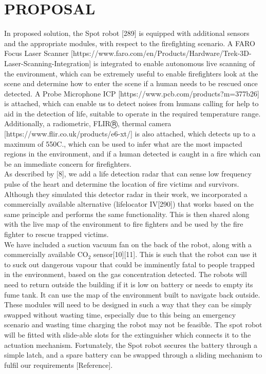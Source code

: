 \section{PROPOSAL}\label{Sec:method}
In proposed solution, the Spot robot [289] is equipped with additional sensors and the appropriate modules, with respect to the firefighting scenario. A FARO Focus Laser Scanner [https://www.faro.com/en/Products/Hardware/Trek-3D-Laser-Scanning-Integration] is integrated to enable autonomous live scanning of the environment, which can be extremely useful to enable firefighters look at the scene and determine how to enter the scene if a human needs to be rescued once detected. A Probe Microphone ICP [https://www.pcb.com/products?m=377b26] is attached, which can enable us to detect noises from humans calling for help to aid in the detection of life, suitable to operate in the required temperature range. Additionally, a radiometric, FLIRⓇ, thermal camera [https://www.flir.co.uk/products/e6-xt/] is also attached, which detects up to a maximum of 550\degree C., which can be used to infer what are the most impacted regions in the environment, and if a human detected is caught in a fire which can be an immediate concern for firefighters. \\

As described by [8], we add a life detection radar that can sense low frequency pulse of the heart and determine the location of fire victims and survivors. Although they simulated this detector radar in their work, we incorporated a commercially available alternative (lifelocator IV[290]) that works based on the same principle and performs the same functionality. This is then shared along with the live map of the environment to fire fighters and be used by the fire fighter to rescue trapped victims.\\

We have included a suction vacuum fan on the back of the robot, along with a commercially available $\mathrm{CO_2}$ sensor[10][11]. This is such that the robot can use it to suck out dangerous vapour that could be imminently fatal to people trapped in the environment, based on the gas concentration detected. The robots will need to return outside the building if it is low on battery or needs to empty its fume tank. It can use the map of the environment built to navigate back outside. These modules will need to be designed in such a way that they can be simply swapped without wasting time, especially due to this being an emergency scenario and wasting time charging the robot may not be feasible. The spot robot will be fitted with slide-able slots for the extinguisher which connects it to the actuation mechanism. Fortunately, the Spot robot secures the battery through a simple latch, and a spare battery can be swapped through a sliding mechanism to fulfil our requirements [Reference]. \\

